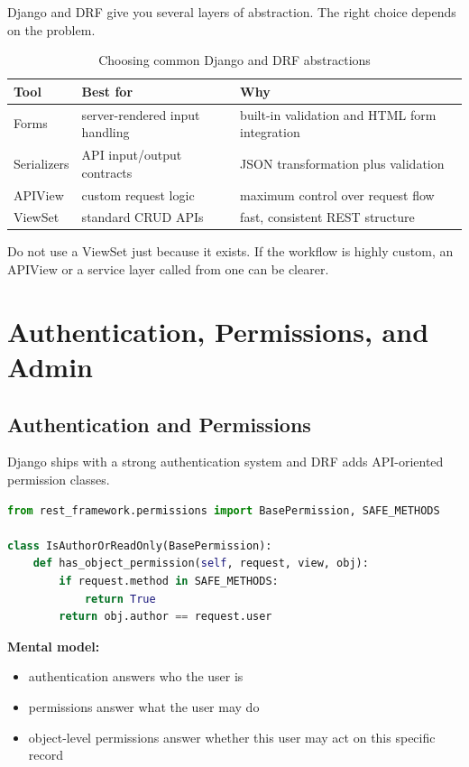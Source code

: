 \documentclass[12pt, a4paper, oneside]{book}
\begin{document}
Django and DRF give you several layers of abstraction. The right choice depends on the problem.

\begin{table}[H]
\centering
\begin{tabular}{|p{}|p{}|p{}|}
\hline
\textbf{Tool} & \textbf{Best for} & \textbf{Why} \\
\hline
Forms & server-rendered input handling & built-in validation and HTML form integration \\
\hline
Serializers & API input/output contracts & JSON transformation plus validation \\
\hline
APIView & custom request logic & maximum control over request flow \\
\hline
ViewSet & standard CRUD APIs & fast, consistent REST structure \\
\hline
\end{tabular}
\caption{Choosing common Django and DRF abstractions}
\end{table}

\begin{notebox}
Do not use a ViewSet just because it exists. If the workflow is highly custom, an APIView or a service layer called from one can be clearer.
\end{notebox}

\section{Authentication, Permissions, and Admin}

\subsection{Authentication and Permissions}
Django ships with a strong authentication system and DRF adds API-oriented permission classes.

\begin{lstlisting}[language=Python, caption={DRF permission example}]
from rest_framework.permissions import BasePermission, SAFE_METHODS

class IsAuthorOrReadOnly(BasePermission):
    def has_object_permission(self, request, view, obj):
        if request.method in SAFE_METHODS:
            return True
        return obj.author == request.user
\end{lstlisting}

\textbf{Mental model:}
\begin{itemize}[leftmargin=2em]
    \item authentication answers who the user is
    \item permissions answer what the user may do
    \item object-level permissions answer whether this user may act on this specific record
\end{itemize}
\end{document}
